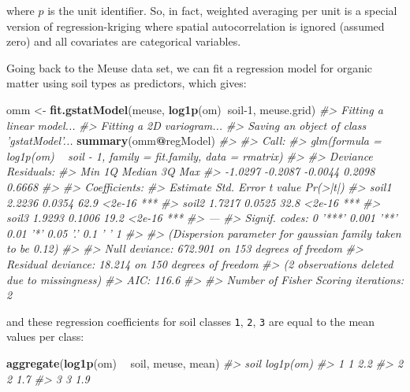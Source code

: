 \documentclass[11pt]{krantz}
\newenvironment{Shaded}{\begin{snugshade}}{\end{snugshade}}
\newcommand{\CommentTok}[1]{\textcolor[rgb]{0.37,0.37,0.37}{\textit{#1}}}
\newcommand{\DecValTok}[1]{\textcolor[rgb]{0.06,0.06,0.06}{#1}}
\newcommand{\KeywordTok}[1]{\textcolor[rgb]{0.27,0.27,0.27}{\textbf{#1}}}
\newcommand{\NormalTok}[1]{#1}
\newcommand{\OperatorTok}[1]{\textcolor[rgb]{0.43,0.43,0.43}{\textbf{#1}}}
\newcommand{\StringTok}[1]{\textcolor[rgb]{0.5,0.5,0.5}{#1}}
\theoremstyle{definition}
\theoremstyle{definition}
\theoremstyle{definition}
\theoremstyle{remark}
\begin{document}
where \(p\) is the unit identifier. So, in fact, weighted averaging per
unit is a special version of regression-kriging where spatial
autocorrelation is ignored (assumed zero) and all covariates are
categorical variables.

Going back to the Meuse data set, we can fit a regression model for
organic matter using soil types as predictors, which gives:

\begin{Shaded}
\begin{Highlighting}[]
\NormalTok{omm <-}\StringTok{ }\KeywordTok{fit.gstatModel}\NormalTok{(meuse, }\KeywordTok{log1p}\NormalTok{(om)}\OperatorTok{~}\NormalTok{soil}\DecValTok{-1}\NormalTok{, meuse.grid)}
\CommentTok{#> Fitting a linear model...}
\CommentTok{#> Fitting a 2D variogram...}
\CommentTok{#> Saving an object of class 'gstatModel'...}
\KeywordTok{summary}\NormalTok{(omm}\OperatorTok{@}\NormalTok{regModel)}
\CommentTok{#> }
\CommentTok{#> Call:}
\CommentTok{#> glm(formula = log1p(om) ~ soil - 1, family = fit.family, data = rmatrix)}
\CommentTok{#> }
\CommentTok{#> Deviance Residuals: }
\CommentTok{#>     Min       1Q   Median       3Q      Max  }
\CommentTok{#> -1.0297  -0.2087  -0.0044   0.2098   0.6668  }
\CommentTok{#> }
\CommentTok{#> Coefficients:}
\CommentTok{#>       Estimate Std. Error t value Pr(>|t|)    }
\CommentTok{#> soil1   2.2236     0.0354    62.9   <2e-16 ***}
\CommentTok{#> soil2   1.7217     0.0525    32.8   <2e-16 ***}
\CommentTok{#> soil3   1.9293     0.1006    19.2   <2e-16 ***}
\CommentTok{#> ---}
\CommentTok{#> Signif. codes:  0 '***' 0.001 '**' 0.01 '*' 0.05 '.' 0.1 ' ' 1}
\CommentTok{#> }
\CommentTok{#> (Dispersion parameter for gaussian family taken to be 0.12)}
\CommentTok{#> }
\CommentTok{#>     Null deviance: 672.901  on 153  degrees of freedom}
\CommentTok{#> Residual deviance:  18.214  on 150  degrees of freedom}
\CommentTok{#>   (2 observations deleted due to missingness)}
\CommentTok{#> AIC: 116.6}
\CommentTok{#> }
\CommentTok{#> Number of Fisher Scoring iterations: 2}
\end{Highlighting}
\end{Shaded}

and these regression coefficients for soil classes \texttt{1},
\texttt{2}, \texttt{3} are equal to the mean values per class:

\begin{Shaded}
\begin{Highlighting}[]
\KeywordTok{aggregate}\NormalTok{(}\KeywordTok{log1p}\NormalTok{(om) }\OperatorTok{~}\StringTok{ }\NormalTok{soil, meuse, mean) }
\CommentTok{#>   soil log1p(om)}
\CommentTok{#> 1    1       2.2}
\CommentTok{#> 2    2       1.7}
\CommentTok{#> 3    3       1.9}
\end{Highlighting}
\end{Shaded}
\end{document}

